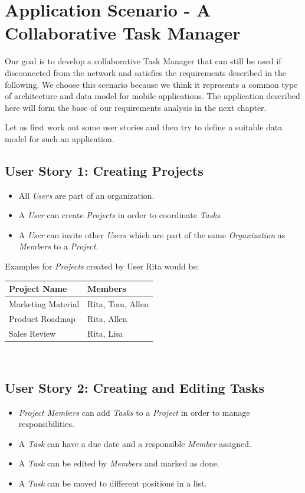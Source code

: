 
\chapter{Application Scenario - A Collaborative Task Manager}
\label{sec:scenario}
Our goal is to develop a collaborative Task Manager that can still be used if disconnected from the network and satisfies the requirements described in the following.
We choose this scenario because we think it represents a common type of architecture and data model for mobile applications.
The application described here will form the base of our requirements analysis in the next chapter.

Let us first work out some user stories and then try to define a suitable data model for such an application.

\section{User Story 1: Creating Projects}
\begin{itemize}
\item All \emph{Users} are part of an organization.
\item A \emph{User} can create \emph{Projects} in order to coordinate \emph{Tasks}.
\item A \emph{User} can invite other \emph{Users} which are part of the same \emph{Organization} as \emph{Members} to a \emph{Project}.
\end{itemize}

Examples for \emph{Projects} created by User Rita would be:\\

\begin{tabular}{ l l }
Project Name & Members \\
\hline
Marketing Material & Rita, Tom, Allen \\
Product Roadmap & Rita, Allen \\
Sales Review & Rita, Lisa
\end{tabular}\\

\section{User Story 2: Creating and Editing Tasks}
\begin{itemize}
\item \emph{Project Members} can add \emph{Tasks} to a \emph{Project} in order to manage responsibilities.
\item A \emph{Task} can have a due date and a responsible \emph{Member} assigned.
\item A \emph{Task} can be edited by \emph{Members} and marked as done.
\item A \emph{Task} can be moved to different positions in a list.
\end{itemize}

